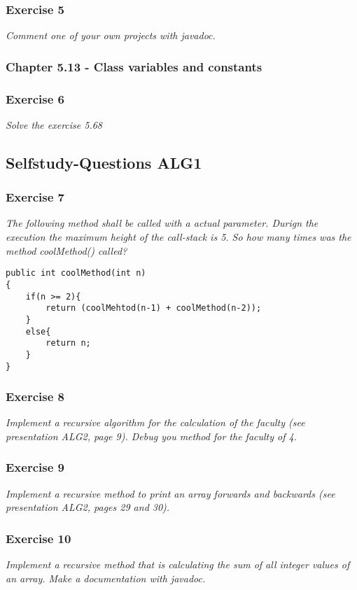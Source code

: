 \subsubsection*{Exercise 5}
\textit{Comment one of your own projects with javadoc.} \\

\subsubsection{Chapter 5.13 - Class variables and constants}

\subsubsection*{Exercise 6}
\textit{Solve the exercise 5.68} \\



\subsection{Selfstudy-Questions ALG1}

\subsubsection*{Exercise 7}
\textit{The following method shall be called with a actual parameter.
Durign the execution the maximum height of the call-stack is 5.
So how many times was the method coolMethod() called?} \\

\begin{lstlisting}
public int coolMethod(int n)
{
	if(n >= 2){
		return (coolMehtod(n-1) + coolMethod(n-2));
	} 
	else{
		return n;
	}
}
\end{lstlisting}

\subsubsection*{Exercise 8}
\textit{Implement a recursive algorithm for the calculation of the
faculty (see presentation ALG2, page 9). Debug you method for the
faculty of 4.} \\

\subsubsection*{Exercise 9}
\textit{Implement a recursive method to print an array forwards and
 backwards (see presentation ALG2, pages 29 and 30).} \\

\subsubsection*{Exercise 10}
\textit{Implement a recursive method that is calculating the sum of
all integer values of an array. Make a documentation with javadoc.} \\

